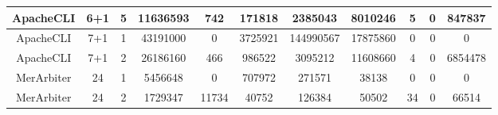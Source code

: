 \begin{table*}[]
\begin{tabular}{@{}ccccccccccc@{}}
        ApacheCLI                                                & 6+1                                                        & 5    & 11636593                                                    & 742                                                                       & 171818                                                  & 2385043                                                    & 8010246                                                        & 5                                                         & 0                                                         & 847837  \\ \midrule
        ApacheCLI                                                & 7+1                                                        & 1    & 43191000                                                    & 0                                                                         & 3725921                                                 & 144990567                                                  & 17875860                                                       & 0                                                         & 0                                                         & 0       \\ \midrule
        ApacheCLI                                                & 7+1                                                        & 2    & 26186160                                                    & 466                                                                       & 986522                                                  & 3095212                                                    & 11608660                                                       & 4                                                         & 0                                                         & 6854478 \\ \midrule
        MerArbiter                                               & 24                                                         & 1    & 5456648                                                     & 0                                                                         & 707972                                                  & 271571                                                     & 38138                                                          & 0                                                         & 0                                                         & 0       \\ \midrule
        MerArbiter                                               & 24                                                         & 2    & 1729347                                                     & 11734                                                                     & 40752                                                   & 126384                                                     & 50502                                                          & 34                                                        & 0                                                         & 66514   \\ \midrule

\end{tabular}
\end{table*}
